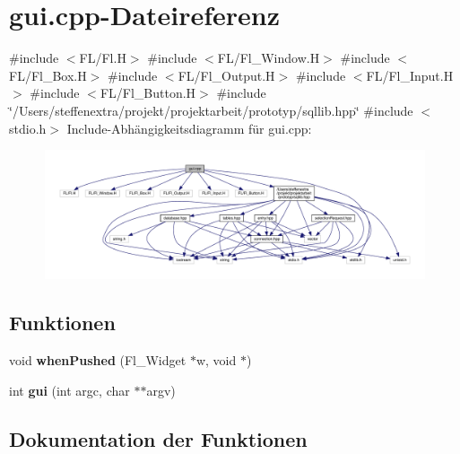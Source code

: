 \section{gui.\+cpp-\/\+Dateireferenz}
\label{gui_8cpp}
{\ttfamily \#include $<$F\+L/\+Fl.\+H$>$}\newline
{\ttfamily \#include $<$F\+L/\+Fl\+\_\+\+Window.\+H$>$}\newline
{\ttfamily \#include $<$F\+L/\+Fl\+\_\+\+Box.\+H$>$}\newline
{\ttfamily \#include $<$F\+L/\+Fl\+\_\+\+Output.\+H$>$}\newline
{\ttfamily \#include $<$F\+L/\+Fl\+\_\+\+Input.\+H$>$}\newline
{\ttfamily \#include $<$F\+L/\+Fl\+\_\+\+Button.\+H$>$}\newline
{\ttfamily \#include \char`\"{}/\+Users/steffenextra/projekt/projektarbeit/prototyp/sqllib.\+hpp\char`\"{}}\newline
{\ttfamily \#include $<$stdio.\+h$>$}\newline
Include-\/\+Abhängigkeitsdiagramm für gui.\+cpp\+:\nopagebreak
\begin{figure}[H]
\begin{center}
\leavevmode
\includegraphics[width=350pt]{gui_8cpp__incl}
\end{center}
\end{figure}
\subsection*{Funktionen}
\begin{DoxyCompactItemize}
\item 
void \textbf{ when\+Pushed} (Fl\+\_\+\+Widget $\ast$w, void $\ast$)
\item 
int \textbf{ gui} (int argc, char $\ast$$\ast$argv)
\end{DoxyCompactItemize}


\subsection{Dokumentation der Funktionen}
\mbox{\label{gui_8cpp_ace0698412b74cdbc0571809a0d903b49}} 
